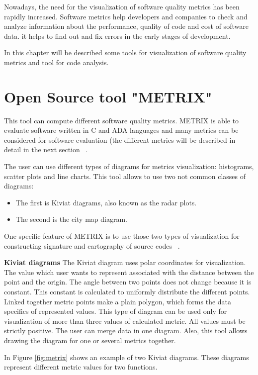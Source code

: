 Nowadays, the need for the visualization of software quality metrics has been rapidly increased. Software metrics help developers and companies to check and analyze information about the performance, quality of code and cost of software data. it helps to find out and fix errors in the early stages of development.

In this chapter will be described some tools for visualization of software quality metrics and tool for code analysis.

\section{Open Source tool "METRIX"}

This tool can compute different software quality metrics. METRIX is able to evaluate software written in C and ADA languages and many metrics can be considered for software evaluation (the different metrics will be described in detail in the next section ~\cite{metrix}. 

The user can use different types of diagrams for metrics visualization: histograms, scatter plots and line charts. 
This tool allows to use two not common classes of diagrams: 

\begin{itemize}
	\item The first is Kiviat diagrams, also known as the radar plots.
	\item The second is the city map diagram.
\end{itemize}

One specific feature of METRIX is to use those two types of visualization for constructing signature and cartography of source codes ~\cite{metrix}.
 
\textbf{Kiviat diagrams}
The Kiviat diagram uses polar coordinates for visualization. The value which user wants to represent associated with the distance between the point and the origin. The angle between two points does not change because it is constant. This constant is calculated to uniformly distribute the different points. Linked together metric points make a plain polygon, which forms the data specifics of represented values. This type of diagram can be used only for visualization of more than three values of calculated metric. All values must be strictly positive. The user can merge data in one diagram. Also, this tool allows drawing the diagram for one or several metrics together. 

In Figure \ref{fig:metrix} shows an example of two Kiviat diagrams. These diagrams represent different metric values for two functions. 

